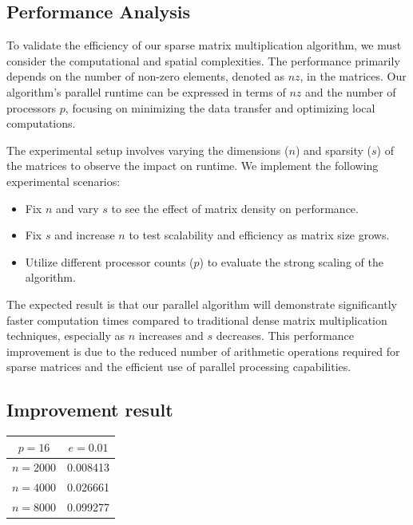\documentclass{article}
\begin{document}
\subsection{Performance Analysis}
To validate the efficiency of our sparse matrix multiplication algorithm, we must consider the computational and spatial complexities. The performance primarily depends on the number of non-zero elements, denoted as \( nz \), in the matrices. Our algorithm's parallel runtime can be expressed in terms of \( nz \) and the number of processors \( p \), focusing on minimizing the data transfer and optimizing local computations.

The experimental setup involves varying the dimensions (\( n \)) and sparsity (\( s \)) of the matrices to observe the impact on runtime. We implement the following experimental scenarios:

\begin{itemize}
    \item Fix \( n \) and vary \( s \) to see the effect of matrix density on performance.
    \item Fix \( s \) and increase \( n \) to test scalability and efficiency as matrix size grows.
    \item Utilize different processor counts (\( p \)) to evaluate the strong scaling of the algorithm.
\end{itemize}

The expected result is that our parallel algorithm will demonstrate significantly faster computation times compared to traditional dense matrix multiplication techniques, especially as \( n \) increases and \( s \) decreases. This performance improvement is due to the reduced number of arithmetic operations required for sparse matrices and the efficient use of parallel processing capabilities.

\subsection{Improvement result}
\begin{table}[H]
\centering
\begin{tabular}{cc}
\toprule
\( p = 16 \) & \( e = 0.01 \) \\
\midrule
\( n = 2000 \) & 0.008413 \\
\( n = 4000 \) & 0.026661 \\
\( n = 8000 \) & 0.099277 \\
\bottomrule
\end{tabular}
\end{table}
\end{document}

